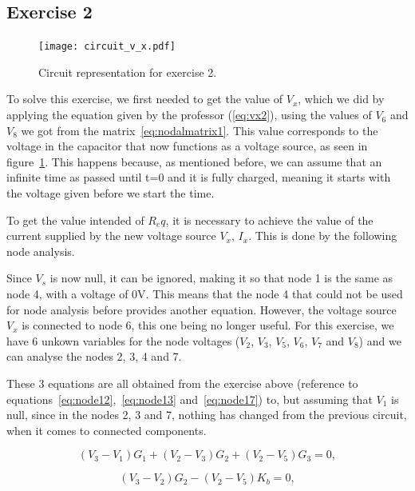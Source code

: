 \subsection{Exercise 2}
\label{sec:exercise2}



\label{sec:Exercise 2}
\begin{figure}[!ht] \centering
\texttt{[image: circuit\_v\_x.pdf]}
\caption{Circuit representation for exercise 2.}
\label{fig:nodeanalysis2}
\end{figure}

To solve this exercise, we first needed to get the value of $V_x$, which we did by applying the equation given by the professor (\ref{eq:vx2}), using the values of $V_6$ and $V_8$ we got from the matrix~\ref{eq:nodalmatrix1}. This value corresponds to the voltage in the capacitor that now functions as a voltage source, as seen in figure~\ref{fig:nodeanalysis2}. This happens because, as mentioned before, we can assume that an infinite time as passed until t=0 and it is fully charged, meaning it starts with the voltage given before we start the time.

To get the value intended of $R_eq$, it is necessary to achieve the value of the current supplied by the new voltage source $V_x$, $I_x$. This is done by the following node analysis.

Since $V_s$ is now null, it can be ignored, making it so that node 1 is the same as node 4, with a voltage of 0V. This means that the node 4 that could not be used for node analysis before provides another equation. However, the voltage source $V_x$ is connected to node 6, this one being no longer useful. For this exercise, we have 6 unkown variables for the node voltages ($V_2$, $V_3$, $V_5$, $V_6$, $V_7$ and $V_8$) and we can analyse the nodes 2, 3, 4 and 7.

These 3 equations are all obtained from the exercise above (reference to equations~\ref{eq:node12},~\ref{eq:node13} and~\ref{eq:node17}) to, but assuming that $V_1$ is null, since in the nodes 2, 3 and 7, nothing has changed from the previous circuit, when it comes to connected components.

\begin{equation}
  (V_{3} - V_{1})G_{1} + (V_{2} - V_{3})G_{2} + (V_{2} - V_{5})G_{3}= 0,
  \label{eq:node22}
\end{equation}

\begin{equation}
  (V_{3} - V_{2})G_{2} - (V_{2} - V_{5})K_{b} = 0,
  \label{eq:node23}
\end{equation}

